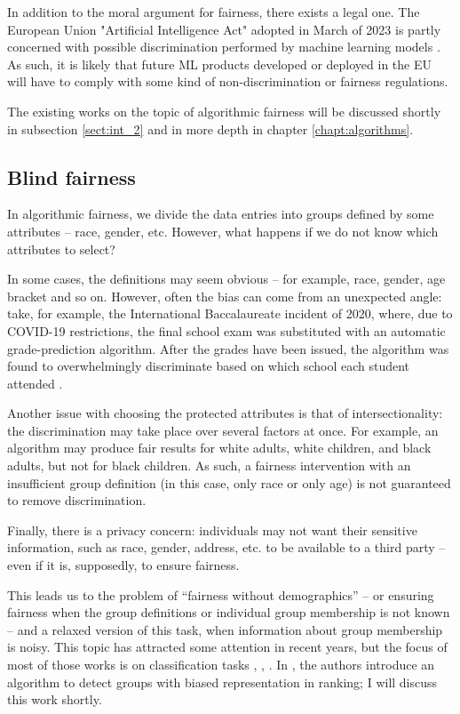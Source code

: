 In addition to the moral argument for fairness, there exists a legal one. The European Union "Artificial Intelligence Act" adopted in March of 2023 is partly concerned with possible discrimination performed by machine learning models \cite{aiact}. As such, it is likely that future ML products developed or deployed in the EU will have to comply with some kind of non-discrimination or fairness regulations.

The existing works on the topic of algorithmic fairness will be discussed shortly in subsection \ref{sect:int_2} and in more depth in chapter \ref{chapt:algorithms}.

\subsection{Blind fairness}\label{subsect:int_1_1}

In algorithmic fairness, we divide the data entries into groups defined by some attributes – race, gender, etc. However, what happens if we do not know which attributes to select?

In some cases, the definitions may seem obvious – for example, race, gender, age bracket and so on. However, often the bias can come from an unexpected angle: take, for example, the International Baccalaureate incident of 2020, where, due to COVID-19 restrictions, the final school exam was substituted with an automatic grade-prediction algorithm. After the grades have been issued, the algorithm was found to overwhelmingly discriminate based on which school each student attended \cite{nyt_baccalaureate}.

Another issue with choosing the protected attributes is that of intersectionality: the discrimination may take place over several factors at once. For example, an algorithm may produce fair results for white adults, white children, and black adults, but not for black children. As such, a fairness intervention with an insufficient group definition (in this case, only race or only age) is not guaranteed to remove discrimination.

Finally, there is a privacy concern: individuals may not want their sensitive information, such as race, gender, address, etc. to be available to a third party – even if it is, supposedly, to ensure fairness.

This leads us to the problem of “fairness without demographics” – or ensuring fairness when the group definitions or individual group membership is not known – and a relaxed version of this task, when information about group membership is noisy. This topic has attracted some attention in recent years, but the focus of most of those works is on classification tasks \cite{https://arxiv.org/pdf/1904.05419.pdf}, \cite{MithraCoverage}, \cite{https://www.vldb.org/pvldb/vol14/p2719-moskovitch.pdf}. In \cite{detectionofgroups}, the authors introduce an algorithm to detect groups with biased representation in ranking; I will discuss this work shortly.

